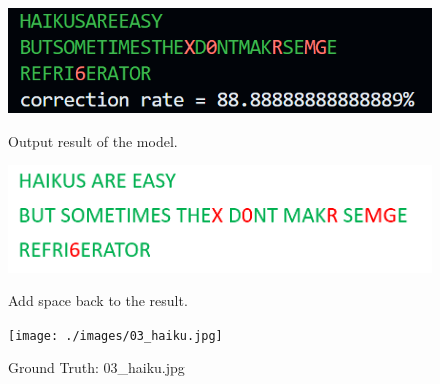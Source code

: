 \documentclass{article}
\begin{document}
\begin{figure}[H]
	\centering
	\begin{minipage}{0.33\linewidth}
		\centering
		\includegraphics[width=\linewidth]{./Q44_res3.png}
		\caption{Output result of the model.}
		\label{fig:Q44_res3}
	\end{minipage}%
	\hfill
	\begin{minipage}{0.33\linewidth}
		\centering
		\includegraphics[width=1\linewidth, height=0.25\columnwidth]{./Q44_add_space3.png}
		\caption{Add space back to the result.}
		\label{fig:Q44_add_space3}
	\end{minipage}%
	\hfill
	\begin{minipage}{0.33\linewidth}
		\centering
		\texttt{[image: ./images/03\_haiku.jpg]}
		\caption{Ground Truth: 03\_haiku.jpg}
		\label{fig:Q44_res3_gt}
	\end{minipage}
\end{figure}
\end{document}
